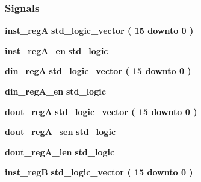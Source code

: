 \subsubsection*{Signals}
 \begin{DoxyCompactItemize}
\item 
{\bf inst\+\_\+regA} {\bfseries \textcolor{comment}{std\+\_\+logic\+\_\+vector}\textcolor{vhdlchar}{ }\textcolor{vhdlchar}{(}\textcolor{vhdlchar}{ }\textcolor{vhdlchar}{ } \textcolor{vhdldigit}{15} \textcolor{vhdlchar}{ }\textcolor{keywordflow}{downto}\textcolor{vhdlchar}{ }\textcolor{vhdlchar}{ } \textcolor{vhdldigit}{0} \textcolor{vhdlchar}{ }\textcolor{vhdlchar}{)}\textcolor{vhdlchar}{ }} 
\item 
{\bf inst\+\_\+reg\+A\+\_\+en} {\bfseries \textcolor{comment}{std\+\_\+logic}\textcolor{vhdlchar}{ }} 
\item 
{\bf din\+\_\+regA} {\bfseries \textcolor{comment}{std\+\_\+logic\+\_\+vector}\textcolor{vhdlchar}{ }\textcolor{vhdlchar}{(}\textcolor{vhdlchar}{ }\textcolor{vhdlchar}{ } \textcolor{vhdldigit}{15} \textcolor{vhdlchar}{ }\textcolor{keywordflow}{downto}\textcolor{vhdlchar}{ }\textcolor{vhdlchar}{ } \textcolor{vhdldigit}{0} \textcolor{vhdlchar}{ }\textcolor{vhdlchar}{)}\textcolor{vhdlchar}{ }} 
\item 
{\bf din\+\_\+reg\+A\+\_\+en} {\bfseries \textcolor{comment}{std\+\_\+logic}\textcolor{vhdlchar}{ }} 
\item 
{\bf dout\+\_\+regA} {\bfseries \textcolor{comment}{std\+\_\+logic\+\_\+vector}\textcolor{vhdlchar}{ }\textcolor{vhdlchar}{(}\textcolor{vhdlchar}{ }\textcolor{vhdlchar}{ } \textcolor{vhdldigit}{15} \textcolor{vhdlchar}{ }\textcolor{keywordflow}{downto}\textcolor{vhdlchar}{ }\textcolor{vhdlchar}{ } \textcolor{vhdldigit}{0} \textcolor{vhdlchar}{ }\textcolor{vhdlchar}{)}\textcolor{vhdlchar}{ }} 
\item 
{\bf dout\+\_\+reg\+A\+\_\+sen} {\bfseries \textcolor{comment}{std\+\_\+logic}\textcolor{vhdlchar}{ }} 
\item 
{\bf dout\+\_\+reg\+A\+\_\+len} {\bfseries \textcolor{comment}{std\+\_\+logic}\textcolor{vhdlchar}{ }} 
\item 
{\bf inst\+\_\+regB} {\bfseries \textcolor{comment}{std\+\_\+logic\+\_\+vector}\textcolor{vhdlchar}{ }\textcolor{vhdlchar}{(}\textcolor{vhdlchar}{ }\textcolor{vhdlchar}{ } \textcolor{vhdldigit}{15} \textcolor{vhdlchar}{ }\textcolor{keywordflow}{downto}\textcolor{vhdlchar}{ }\textcolor{vhdlchar}{ } \textcolor{vhdldigit}{0} \textcolor{vhdlchar}{ }\textcolor{vhdlchar}{)}\textcolor{vhdlchar}{ }} 

\end{DoxyCompactItemize}
